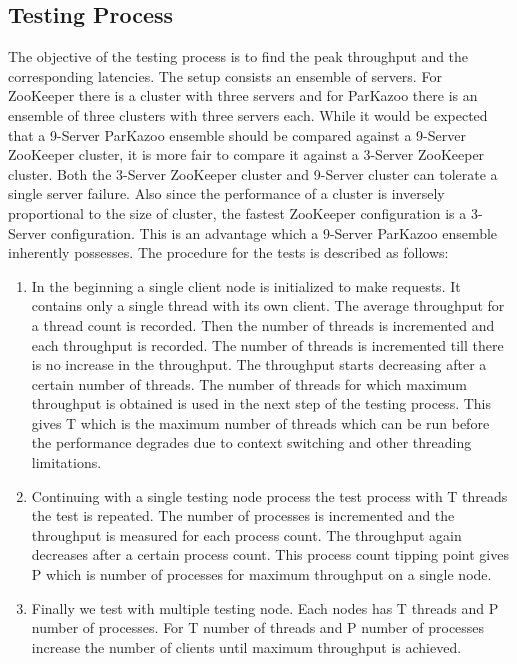 \subsection{Testing Process}
The objective of the testing process is to find the peak throughput and the corresponding latencies. The setup consists an ensemble of servers. For ZooKeeper there is a cluster with three servers and for ParKazoo there is an ensemble of three clusters with three servers each. While it would be expected that a 9-Server ParKazoo ensemble should be compared against a 9-Server ZooKeeper cluster, it is more fair to compare it against a 3-Server ZooKeeper cluster. Both the 3-Server ZooKeeper cluster and 9-Server cluster can tolerate a single server failure. Also since the performance of a cluster is inversely proportional to the size of cluster, the fastest ZooKeeper configuration is a 3-Server configuration. This is an advantage which a 9-Server ParKazoo ensemble inherently possesses. The procedure for the tests is described as follows:

\begin{enumerate}
  \item In the beginning a single client node is initialized to make requests. It contains only a single thread with its own client. The average throughput for a thread count is recorded. Then the number of threads is incremented and each throughput is recorded. The number of threads is incremented till there is no increase in the throughput. The throughput starts decreasing after a certain number of threads. The number of threads for which maximum throughput is obtained is used in the next step of the testing process. This gives T which is the maximum number of threads which can be run before the performance degrades due to context switching and other threading limitations.
  \item Continuing with a single testing node process the test process with T threads the test is repeated. The number of processes is incremented and the throughput is measured for each process count. The throughput again decreases after a certain process count. This process count tipping point gives P which is number of processes for maximum throughput on a single node.
  \item Finally we test with multiple testing node. Each nodes has T threads and P number of processes. For T number of threads and P number of processes increase the number of clients until maximum throughput is achieved.
\end{enumerate}

